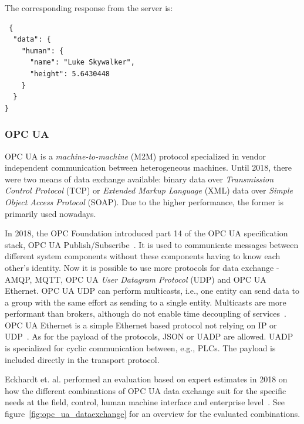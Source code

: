 The corresponding response from the server is:

\begin{minipage}{\linewidth}
\begin{lstlisting}
 {
  "data": {
    "human": {
      "name": "Luke Skywalker",
      "height": 5.6430448
    }
  }
}
\end{lstlisting}
\end{minipage}

\subsubsection{OPC UA}
OPC UA is a \textit{machine-to-machine} (M2M) protocol specialized in vendor independent communication between heterogeneous machines. Until 2018, there were two means of data exchange available: binary data over \textit{Transmission Control Protocol} (TCP) or \textit{Extended Markup Language} (XML) data over \textit{Simple Object Access Protocol} (SOAP). Due to the higher performance, the former is primarily used nowadays.~\cite{Schleipen2016OPCVariability} 

In 2018, the OPC Foundation introduced part 14 of the OPC UA specification stack, OPC UA Publish/Subscribe~\cite{OPC-Foundation2018OPC1.04}. It is used to communicate messages between different system components without these components having to know each other’s identity. Now it is possible to use more protocols for data exchange - AMQP, MQTT, OPC UA \textit{User Datagram Protocol} (UDP) and OPC UA Ethernet. OPC UA UDP can perform multicasts, i.e., one entity can send data to a group with the same effort as sending to a single entity. Multicasts are more performant than brokers, although do not enable time decoupling of services~\cite{Eckhardt2018AnCases}. OPC UA Ethernet is a simple Ethernet based protocol not relying on IP or UDP~\cite{OPC-Foundation2018OPC1.04}. As for the payload of the protocols, JSON or UADP are allowed. UADP is specialized for cyclic communication between, e.g., PLCs. The payload is included directly in the transport protocol.

Eckhardt et. al. performed an evaluation based on expert estimates in 2018 on how the different combinations of OPC UA data exchange suit for the specific needs at the field, control, human machine interface and enterprise level~\cite{Eckhardt2018AnCases}. See figure~\ref{fig:opc_ua_dataexchange} for an overview for the evaluated combinations.

